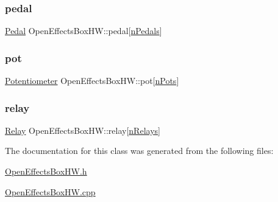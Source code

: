 \mbox{\label{class_open_effects_box_h_w_a1a6432eed1b73a5b3cbf18da9085beb1}} 
\subsubsection{\texorpdfstring{pedal}{pedal}}
{\footnotesize\ttfamily \mbox{\hyperlink{class_pedal}{Pedal}} Open\+Effects\+Box\+H\+W\+::pedal\mbox{[}\mbox{\hyperlink{_open_effects_box_h_w_8h_a4fea7d8a44c63d401b302fd9ce5964bf}{n\+Pedals}}\mbox{]}}

\mbox{\label{class_open_effects_box_h_w_a7f9ef97832b111faf82ba832cfa42fe6}} 
\subsubsection{\texorpdfstring{pot}{pot}}
{\footnotesize\ttfamily \mbox{\hyperlink{class_potentiometer}{Potentiometer}} Open\+Effects\+Box\+H\+W\+::pot\mbox{[}\mbox{\hyperlink{_open_effects_box_h_w_8h_a352d1681e96241516bf636a810bd26d9}{n\+Pots}}\mbox{]}}

\mbox{\label{class_open_effects_box_h_w_a106b87ae726618d5f816ad4e9cfe2cbc}} 
\subsubsection{\texorpdfstring{relay}{relay}}
{\footnotesize\ttfamily \mbox{\hyperlink{class_relay}{Relay}} Open\+Effects\+Box\+H\+W\+::relay\mbox{[}\mbox{\hyperlink{_open_effects_box_h_w_8h_a6da04c873e299e44ccf5a2fe43f50ae1}{n\+Relays}}\mbox{]}}



The documentation for this class was generated from the following files\+:\begin{DoxyCompactItemize}
\item 
\mbox{\hyperlink{_open_effects_box_h_w_8h}{Open\+Effects\+Box\+H\+W.\+h}}\item 
\mbox{\hyperlink{_open_effects_box_h_w_8cpp}{Open\+Effects\+Box\+H\+W.\+cpp}}\end{DoxyCompactItemize}
